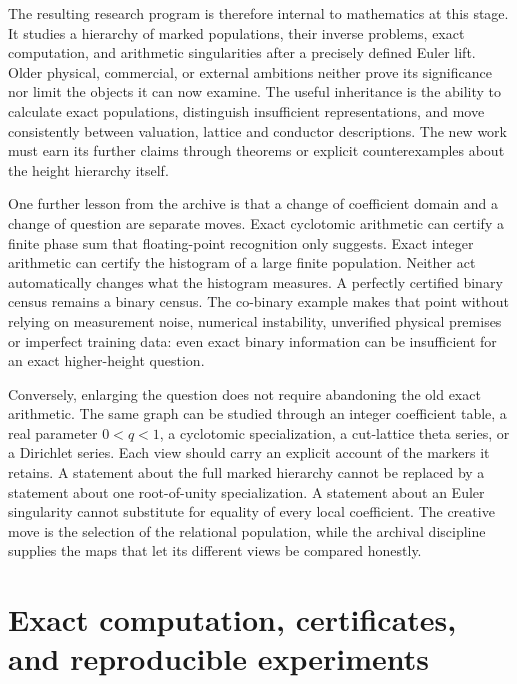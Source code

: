 \documentclass[
  11pt,
  a4paper,
]{report}
\begin{document}
The resulting research program is therefore internal to mathematics at
this stage. It studies a hierarchy of marked populations, their inverse
problems, exact computation, and arithmetic singularities after a
precisely defined Euler lift. Older physical, commercial, or external
ambitions neither prove its significance nor limit the objects it can
now examine. The useful inheritance is the ability to calculate exact
populations, distinguish insufficient representations, and move
consistently between valuation, lattice and conductor descriptions. The
new work must earn its further claims through theorems or explicit
counterexamples about the height hierarchy itself.

One further lesson from the archive is that a change of coefficient
domain and a change of question are separate moves. Exact cyclotomic
arithmetic can certify a finite phase sum that floating-point
recognition only suggests. Exact integer arithmetic can certify the
histogram of a large finite population. Neither act automatically
changes what the histogram measures. A perfectly certified binary census
remains a binary census. The co-binary example makes that point without
relying on measurement noise, numerical instability, unverified physical
premises or imperfect training data: even exact binary information can
be insufficient for an exact higher-height question.

Conversely, enlarging the question does not require abandoning the old
exact arithmetic. The same graph can be studied through an integer
coefficient table, a real parameter \(0<q<1\), a cyclotomic
specialization, a cut-lattice theta series, or a Dirichlet series. Each
view should carry an explicit account of the markers it retains. A
statement about the full marked hierarchy cannot be replaced by a
statement about one root-of-unity specialization. A statement about an
Euler singularity cannot substitute for equality of every local
coefficient. The creative move is the selection of the relational
population, while the archival discipline supplies the maps that let its
different views be compared honestly.

\hypertarget{exact-computation-certificates-and-reproducible-experiments}{%
\chapter{Exact computation, certificates, and reproducible
experiments}\label{exact-computation-certificates-and-reproducible-experiments}}
\end{document}
